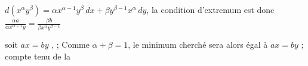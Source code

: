  $d(x^\alpha y^\beta)=\alpha x^{\alpha-1}y^\beta\,dx+\beta y^{\beta-1}x^\alpha\,dy$,
la condition d'extremum est donc $\frac{\alpha a}{\alpha x^{\alpha-1}y}=\frac{\beta b}{\beta x^\alpha y^{\beta-1}}$

soit $ax=by$ \deleted{\unsure{$=$}},   ;  Comme $\alpha+\beta=1$, le minimum cherché sera alors  égal à $ax=by$ ; compte tenu de la 

